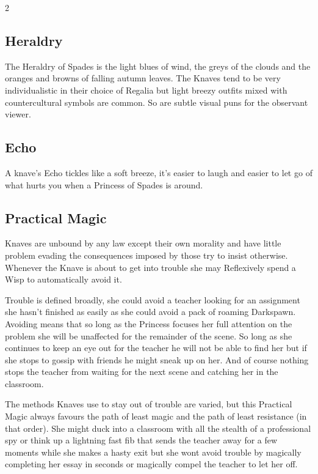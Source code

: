 \begin{multicols}{2}
\subsection*{Heraldry}

The Heraldry of Spades is the light blues of wind, the greys of the clouds and the oranges and browns of falling autumn leaves. The Knaves tend to be very individualistic in their choice of Regalia but light breezy outfits mixed with countercultural symbols are common. So are subtle visual puns for the observant viewer. 

\subsection*{Echo}

A knave's Echo tickles like a soft breeze, it's easier to laugh and easier to let go of what hurts you when a Princess of Spades is around. 

\subsection*{Practical Magic}

Knaves are unbound by any law except their own morality and have little problem evading the consequences imposed by those try to insist otherwise. Whenever the Knave is about to get into trouble she may Reflexively spend a Wisp to automatically avoid it. 

Trouble is defined broadly, she could avoid a teacher looking for an assignment she hasn't finished as easily as she could avoid a pack of roaming Darkspawn. Avoiding means that so long as the Princess focuses her full attention on the problem she will be unaffected for the remainder of the scene. So long as she continues to keep an eye out for the teacher he will not be able to find her but if she stops to gossip with friends he might sneak up on her. And of course nothing stops the teacher from waiting for the next scene and catching her in the classroom.

The methods Knaves use to stay out of trouble are varied, but this Practical Magic always favours the path of least magic and the path of least resistance (in that order). She might duck into a classroom with all the stealth of a professional spy or think up a lightning fast fib that sends the teacher away for a few moments while she makes a hasty exit but she wont avoid trouble by magically completing her essay in seconds or magically compel the teacher to let her off. 


\end{multicols}
